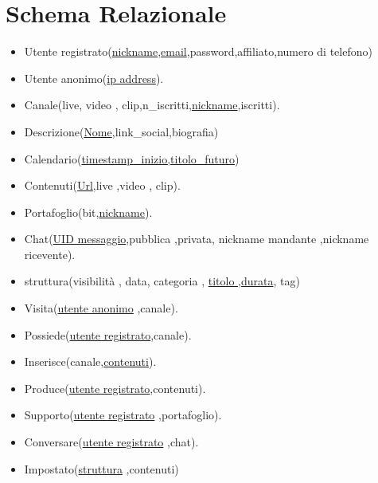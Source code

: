 \section{Schema Relazionale}
\begin{itemize}
    \item Utente registrato(\underline{nickname},\underline{email},password,affiliato,numero di telefono)
    \item Utente anonimo(\underline{ip address}).
    \item Canale(live, video , clip,n\_iscritti,\underline{nickname},iscritti).
    \item Descrizione(\underline{Nome},link\_social,biografia) 
    \item Calendario(\underline{timestamp\_inizio,titolo\_futuro})
    \item Contenuti(\underline{Url},live ,video , clip).
    \item Portafoglio(bit,\underline{nickname}). 
    \item Chat(\underline{UID messaggio},pubblica ,privata, nickname mandante ,nickname ricevente). 
    \item struttura(visibilità , data, categoria , \underline{titolo ,durata}, tag)
    \item Visita(\underline{utente anonimo} ,canale).
    \item Possiede(\underline{utente registrato},canale).
    \item Inserisce(canale,\underline{contenuti}).
    \item Produce(\underline{utente registrato},contenuti).
    \item Supporto(\underline{utente registrato} ,portafoglio).
    \item Conversare(\underline{utente registrato} ,chat).
    \item Impostato(\underline{struttura} ,contenuti)
\end{itemize}